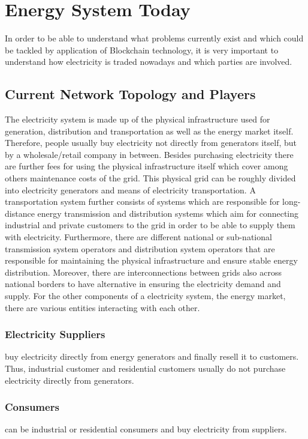 \documentclass[runningheads]{llncs}
\begin{document}
\section{Energy System Today}
In order to be able to understand what problems currently exist and which could be tackled by application of Blockchain technology, it is very important to understand how electricity is traded nowadays and which parties are involved.

\subsection{Current Network Topology and Players}
The electricity system is made up of the physical infrastructure used for generation, distribution and transportation as well as the energy market itself. Therefore, people usually buy electricity not directly from generators itself, but by a wholesale/retail company in between. Besides purchasing electricity there are further fees for using the physical infrastructure itself which cover among others maintenance costs of the grid.
This physical grid can be roughly divided into electricity generators and means of electricity transportation. A transportation system further consists of systems which are responsible for long-distance energy transmission and distribution systems which aim for connecting industrial and private customers to the grid in order to be able to supply them with electricity. Furthermore, there are different national or sub-national transmission system operators and distribution system operators that are responsible for maintaining the physical infrastructure and ensure stable energy distribution. Moreover, there are interconnections between grids also across national borders to have alternative in ensuring the electricity demand and supply. \cite{eu_energy_market}
For the other components of a electricity system, the energy market, there are various entities interacting with each other.

\subsubsection{Electricity Suppliers} buy electricity directly from energy generators and finally resell it to customers. Thus, industrial customer and residential customers usually do not purchase electricity directly from generators.

\subsubsection{Consumers} can be industrial or residential consumers and buy electricity from suppliers.
\end{document}
